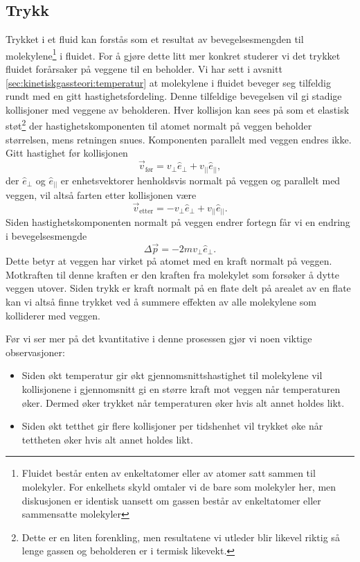 \documentclass[a4paper,norsk,12pt]{article}
\begin{document}
\subsection{Trykk}

Trykket i et fluid kan forstås som et resultat av bevegelsesmengden til molekylene\footnote{Fluidet består enten av enkeltatomer eller av atomer satt sammen til molekyler. For enkelhets skyld omtaler vi de bare som molekyler her, men diskusjonen er identisk uansett om gassen består av enkeltatomer eller sammensatte molekyler} i fluidet. For å gjøre dette litt mer konkret studerer vi det  trykket fluidet forårsaker på veggene til en beholder. Vi har sett i avsnitt \ref{sec:kinetiskgassteori:temperatur} at molekylene i fluidet beveger seg tilfeldig rundt med en gitt hastighetsfordeling. Denne tilfeldige bevegelsen vil gi stadige kollisjoner med veggene av beholderen. Hver kollisjon kan sees på som et elastisk støt\footnote{Dette er en liten forenkling, men resultatene vi utleder blir likevel riktig så lenge gassen og beholderen er i termisk likevekt.} der hastighetskomponenten til atomet normalt på veggen beholder størrelsen, mens retningen snues. Komponenten parallelt med veggen endres ikke. Gitt hastighet før kollisjonen
\begin{displaymath}
	\vec{v}_\text{før} = v_\perp \hat{e}_\perp + v_{||} \hat{e}_{||},
\end{displaymath}
der $ \hat{e}_\perp$ og $\hat{e}_{||}$ er enhetsvektorer henholdsvis normalt på veggen og parallelt med veggen, vil altså farten etter kollisjonen være
\begin{displaymath}
	\vec{v}_\text{etter} = -v_\perp \hat{e}_\perp + v_{||} \hat{e}_{||}.
\end{displaymath}
Siden hastighetskomponenten normalt på veggen endrer fortegn får vi en endring i bevegelsesmengde 
\begin{displaymath}
	\Delta \vec{p} = -2mv_\perp\hat{e}_\perp.
\end{displaymath}
Dette betyr at veggen har virket på atomet med en kraft normalt på veggen. Motkraften til denne kraften er den kraften fra molekylet som forsøker å dytte veggen utover. Siden trykk er kraft normalt på en flate delt på arealet av en flate kan vi altså finne trykket ved å summere effekten av alle molekylene som kolliderer med veggen.

Før vi ser mer på det kvantitative i denne prosessen gjør vi noen viktige observasjoner:
\begin{itemize}
\item
Siden økt temperatur gir økt gjennomsnittshastighet til molekylene vil kollisjonene i gjennomsnitt gi en større kraft mot veggen når temperaturen øker. Dermed øker trykket når temperaturen øker hvis alt annet holdes likt.
\item
Siden økt tetthet gir flere kollisjoner per tidshenhet vil trykket øke når tettheten øker hvis alt annet holdes likt.
\end{itemize}
\end{document}
